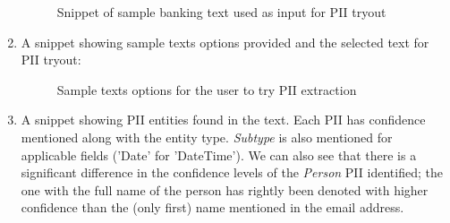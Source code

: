 \begin{enumerate}
\begin {figure}[h!h]
            \caption{Snippet of sample banking text used as input for PII tryout}
            \label{piitryout}
        \end {figure}
    \newpage
    \item A snippet showing sample texts options provided and the selected text for PII tryout:
    \begin {figure}[h!h]
        \centering
        \caption{Sample texts options for the user to try PII extraction}
        \label{sampletexts}
    \end {figure}
    \item A snippet showing \acs{PII} entities found in the text. Each PII has confidence mentioned along with the entity type. \textit{Subtype} is also mentioned for applicable fields ('Date' for 'DateTime'). We can also see that there is a significant difference in the confidence levels of the \textit{Person} PII identified; the one with the full name of the person has rightly been denoted with higher confidence than the (only first) name mentioned in the email address.
        \begin {figure}[h!h]
            \centering

\end{figure}
\end{enumerate}
